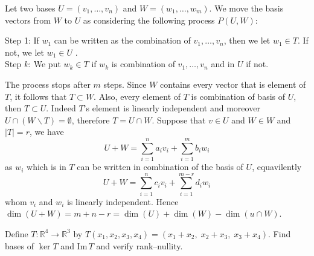 \documentclass[11pt]{article}
\begin{document}
\begin{sol}
    Let two bases $U = (v_1,\dots,v_n)$ and $W = (w_1,\dots, w_m)$. We move the basis vectors from $W$ to $U$ as considering the following process $P(U,W)$:
    
    Step 1: If $w_1$ can be written as the combination of $v_1,\dots,v_n$, then we let $w_1 \in T$. If not, we let $w_1 \in U$ .\\

    Step $k$: We put $w_k \in T$ if $w_k$ is combination of $v_1,\dots,v_n$ and in $U$ if not.

    The process stops after $m$ steps. Since $W$ contains every vector that is element of $T$, it follows that $T \subset W$. Also, every element of $T$ is combination of basis of $U$, then $T \subset U$. Indeed $T$'s element is linearly independent and moreover $U\cap(W\backslash T) = \emptyset$, therefore $T = U \cap W$. Suppose that $v \in U$ and $W \in W$ and $|T| = r$, we have 
    \[
        U + W = \sum_{i = 1}^na_iv_i + \sum_{i = 1}^m b_iw_i 
    \]
as $w_i$ which is in $T$ can be written in combination of the basis of $U$, equavilently
\[
    U + W = \sum_{i = 1}^{n}c_iv_i + \sum_{i = 1}^{m - r}d_iw_i
\]
whom $v_i$ and $w_i$ is linearly independent. Hence $\dim(U + W ) = m + n - r =\dim(U) + \dim(W) - \dim(u \cap W)$.
\end{sol}
\begin{problem}
Define $T:\mathbb{R}^4\to\mathbb{R}^3$ by $T(x_1,x_2,x_3,x_4)=(x_1+x_2,\;x_2+x_3,\;x_3+x_4)$. 
Find bases of $\ker T$ and $\mathrm{Im}\,T$ and verify rank--nullity.
\end{problem}
\end{document}
